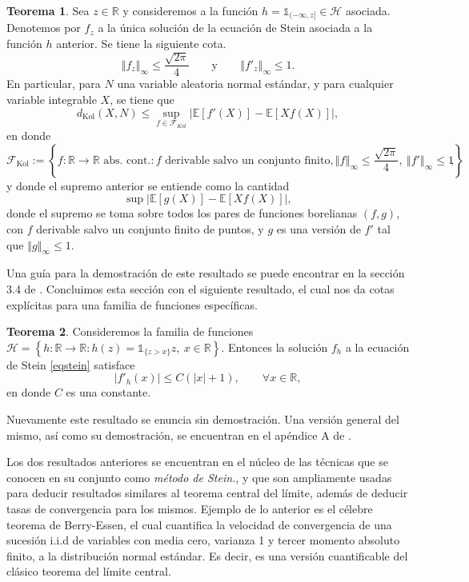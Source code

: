 \documentclass[letterpaper,twoside,12pt]{book}
\newcommand{\R}{\mathbb{R}}
\newcommand{\F}{\mathcal{F}}
\newcommand{\E}{\mathbb{E}}
\newcommand{\1}{\mathds{1}}
\newcommand{\abs}[1]{\left\lvert #1 \right\rvert}
\renewcommand{\to}{\rightarrow}
\newcommand{\norm}[1]{\left\Vert #1 \right\Vert}
\theoremstyle{definition}
\theoremstyle{definition}
\newtheorem{teo}{Teorema}
\theoremstyle{remark}
\theoremstyle{definition}
\theoremstyle{definition}
\theoremstyle{definition}
\theoremstyle{definition}
\theoremstyle{definition}
\begin{document}
 \begin{teo}\label{cotakolmogorovstein}
   Sea $z\in \R$ y consideremos a la función $h=\1_{(-\infty,z]}\in \mathscr{H}$ asociada. Denotemos por $f_z$ a la única solución de la ecuación de Stein asociada a la función $h$ anterior. Se tiene la siguiente cota.
  \[
      \norm{f_z}_{\infty}\leq \frac{\sqrt{2\pi}}{4} \qquad \text{y} \qquad \norm{f'_z}_\infty\leq 1.
  \]
En particular, para $N$ una variable aleatoria normal estándar, y para cualquier variable integrable $X$, se tiene que 
\[
   d_{\text{Kol}}(X,N)\leq \sup_{f\in \F_{Kol}}\abs{\E\left[f'(X)\right]-\E\left[Xf(X)\right]},
\]
en donde 
\[\F_{\text{Kol}}:=\left\{f:\R\to\R \text{ abs. cont.}: f \text{ derivable salvo un conjunto finito}, \norm{f}_\infty\leq \frac{\sqrt{2\pi}}{4}, \ \norm{f'}_\infty\leq 1\right\},\]
y donde el supremo anterior se entiende como la cantidad 
\[
\sup \abs{\E\left[g(X)\right]-\E\left[Xf(X)\right]},
\]
donde el supremo se toma sobre todos los pares de funciones borelianas $(f,g)$, con $f$ derivable salvo un conjunto finito de puntos, y $g$ es una versión de $f'$ tal que $\norm{g}_\infty\leq 1$.
\end{teo}

Una guía para la demostración de este resultado se puede encontrar en la sección 3.4 de \cite{Nourdin_Peccati_2012}. Concluimos esta sección con el siguiente resultado, el cual nos da cotas explícitas para una familia de funciones específicas.

\begin{teo}\label{metodosteinfamespecial}
 Consideremos la familia de funciones $\mathscr{H}=\left\{h:\R\to\R : h(z)=\1_{\{z>x\}}z, \ x\in \R\right\}$. Entonces la solución $f_h$ a la ecuación de Stein \eqref{eqstein} satisface 
 \[
 |f'_h(x)|\leq C(\abs{x}+1), \qquad \forall x\in \R,
 \]
 en donde $C$ es una constante.
 \end{teo}
Nuevamente este resultado se enuncia sin demostración. Una versión general del mismo, así como su demostración, se encuentran en el apéndice A de \cite{HU2014814}.

Los dos resultados anteriores se encuentran en el núcleo de las técnicas que se conocen en su conjunto como \textit{método de Stein.}, y que son ampliamente usadas para deducir resultados similares al teorema central del límite, además de deducir tasas de convergencia para los mismos. Ejemplo de lo anterior es el célebre teorema de Berry-Essen, el cual cuantifica la velocidad de convergencia de una sucesión i.i.d de variables con media cero, varianza 1 y tercer momento absoluto finito, a la distribución normal estándar. Es decir, es una versión cuantificable del clásico teorema del límite central.
\end{document}
